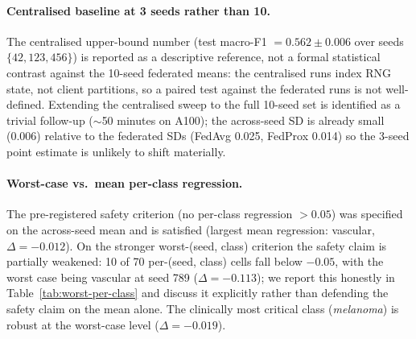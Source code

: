\documentclass[11pt,a4paper]{article}
\begin{document}
\paragraph{Centralised baseline at 3 seeds rather than 10.} The
centralised upper-bound number (test macro-F1 $= 0.562 \pm 0.006$ over
seeds $\{42, 123, 456\}$) is reported as a descriptive reference, not a
formal statistical contrast against the 10-seed federated means: the
centralised runs index RNG state, not client partitions, so a paired
test against the federated runs is not well-defined. Extending the
centralised sweep to the full 10-seed set is identified as a trivial
follow-up ($\sim$50 minutes on A100); the across-seed SD is already
small (0.006) relative to the federated SDs (FedAvg 0.025, FedProx
0.014) so the 3-seed point estimate is unlikely to shift materially.

\paragraph{Worst-case vs.\ mean per-class regression.} The pre-registered
safety criterion (no per-class regression $> 0.05$) was specified on the
across-seed mean and is satisfied (largest mean regression: vascular,
$\Delta = -0.012$). On the stronger worst-(seed, class) criterion the
safety claim is partially weakened: 10 of 70 per-(seed, class) cells
fall below $-0.05$, with the worst case being vascular at seed 789
($\Delta = -0.113$); we report this honestly in
Table~\ref{tab:worst-per-class} and discuss it explicitly rather than
defending the safety claim on the mean alone. The clinically most
critical class (\textit{melanoma}) is robust at the worst-case level
($\Delta = -0.019$).
\end{document}
